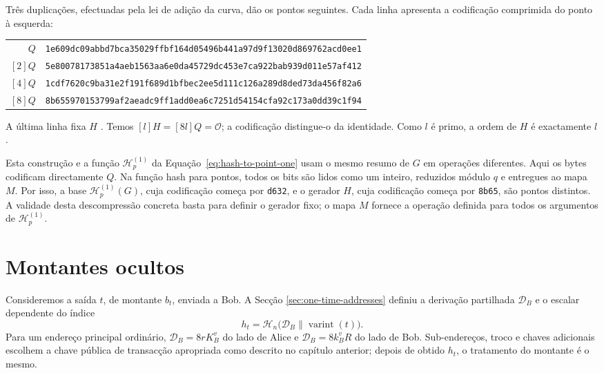 Três duplicações, efectuadas pela lei de adição da curva, dão os pontos
seguintes. Cada linha apresenta a codificação comprimida do ponto à esquerda:
\begin{center}
\small
\begin{tabular}{r@{\quad}l}
\(Q\)&\texttt{1e609dc09abbd7bca35029ffbf164d05496b441a97d9f13020d869762acd0ee1}\\
\([2]Q\)&\texttt{5e80078173851a4aeb1563aa6e0da45729dc453e7ca922bab939d011e57af412}\\
\([4]Q\)&\texttt{1cdf7620c9ba31e2f191f689d1bfbec2ee5d111c126a289d8ded73da456f82a6}\\
\([8]Q\)&\texttt{8b655970153799af2aeadc9ff1add0ea6c7251d54154cfa92c173a0dd39c1f94}
\end{tabular}
\end{center}
A última linha fixa \(H\) \cite{monero-point-maps}. Temos
\([l]H=[8l]Q=\mathcal O\); a codificação distingue-o da identidade.
Como \(l\) é primo, a ordem de \(H\) é exactamente \(l\).

Esta construção e a função \(\mathcal H_p^{(1)}\) da
Equação~\eqref{eq:hash-to-point-one} usam o mesmo resumo de \(G\) em
operações diferentes. Aqui os bytes codificam directamente \(Q\).
Na função hash para pontos, todos os bits são lidos como um inteiro,
reduzidos módulo \(q\) e entregues ao mapa \(M\). Por isso, a base
\(\mathcal H_p^{(1)}(G)\), cuja codificação começa por \texttt{d632},
e o gerador \(H\), cuja codificação começa por \texttt{8b65}, são
pontos distintos. A validade desta descompressão concreta basta para
definir o gerador fixo; o mapa \(M\) fornece a operação definida para
todos os argumentos de \(\mathcal H_p^{(1)}\).

\section{Montantes ocultos}
\label{sec:pedersen_monero}

Consideremos a saída \(t\), de montante \(b_t\), enviada a Bob. A Secção
\ref{sec:one-time-addresses} definiu a derivação partilhada \(\mathcal D_B\)
e o escalar dependente do índice
\[
 h_t=\mathcal H_n\bigl(\mathcal D_B\mathbin\|
              \operatorname{varint}(t)\bigr).
\]
Para um endereço principal ordinário, \(\mathcal D_B=8rK_B^v\) do lado de
Alice e \(\mathcal D_B=8k_B^vR\) do lado de Bob. Sub-endereços, troco e chaves
adicionais escolhem a chave pública de transacção apropriada como descrito no
capítulo anterior; depois de obtido \(h_t\), o tratamento do montante é o
mesmo.


